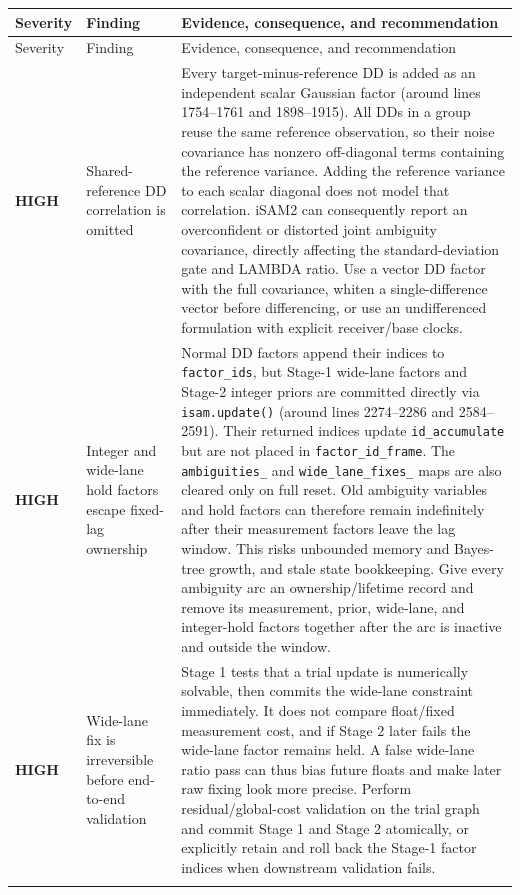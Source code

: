 \documentclass[11pt,a4paper]{article}
\newcommand{\code}[1]{\texttt{#1}}
\newcommand{\high}{\textcolor{red!75!black}{\textbf{HIGH}}}
\begin{document}
\begin{longtable}{>{\raggedright\arraybackslash}p{18mm}p{43mm}p{93mm}}
\toprule
Severity & Finding & Evidence, consequence, and recommendation \\
\midrule
\endfirsthead
\toprule
Severity & Finding & Evidence, consequence, and recommendation \\
\midrule
\endhead

\high & Shared-reference DD correlation is omitted &
Every target-minus-reference DD is added as an independent scalar Gaussian
factor (around lines 1754--1761 and 1898--1915).  All DDs in a group reuse the
same reference observation, so their noise covariance has nonzero off-diagonal
terms containing the reference variance.  Adding the reference variance to
each scalar diagonal does not model that correlation.  iSAM2 can consequently
report an overconfident or distorted joint ambiguity covariance, directly
affecting the standard-deviation gate and LAMBDA ratio.  Use a vector DD factor
with the full covariance, whiten a single-difference vector before differencing,
or use an undifferenced formulation with explicit receiver/base clocks. \\
\addlinespace

\high & Integer and wide-lane hold factors escape fixed-lag ownership &
Normal DD factors append their indices to \code{factor\_ids}, but Stage-1
wide-lane factors and Stage-2 integer priors are committed directly via
\code{isam.update()} (around lines 2274--2286 and 2584--2591).  Their returned
indices update \code{id\_accumulate} but are not placed in
\code{factor\_id\_frame}.  The \code{ambiguities\_} and
\code{wide\_lane\_fixes\_} maps are also cleared only on full reset.  Old
ambiguity variables and hold factors can therefore remain indefinitely after
their measurement factors leave the lag window.  This risks unbounded memory
and Bayes-tree growth, and stale state bookkeeping.  Give every ambiguity arc
an ownership/lifetime record and remove its measurement, prior, wide-lane, and
integer-hold factors together after the arc is inactive and outside the window. \\
\addlinespace

\high & Wide-lane fix is irreversible before end-to-end validation &
Stage 1 tests that a trial update is numerically solvable, then commits the
wide-lane constraint immediately.  It does not compare float/fixed measurement
cost, and if Stage 2 later fails the wide-lane factor remains held.  A false
wide-lane ratio pass can thus bias future floats and make later raw fixing look
more precise.  Perform residual/global-cost validation on the trial graph and
commit Stage 1 and Stage 2 atomically, or explicitly retain and roll back the
Stage-1 factor indices when downstream validation fails. \\
\addlinespace


\end{longtable}
\end{document}
